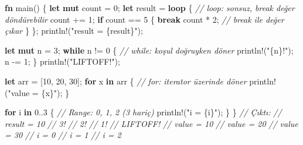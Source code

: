 \documentclass[12pt,a4paper]{article}
\newenvironment{Shaded}{}{}
\newcommand{\CommentTok}[1]{\textcolor[rgb]{0.38,0.63,0.69}{\textit{#1}}}
\newcommand{\ControlFlowTok}[1]{\textcolor[rgb]{0.00,0.44,0.13}{\textbf{#1}}}
\newcommand{\DecValTok}[1]{\textcolor[rgb]{0.25,0.63,0.44}{#1}}
\newcommand{\FunctionTok}[1]{\textcolor[rgb]{0.02,0.16,0.49}{#1}}
\newcommand{\KeywordTok}[1]{\textcolor[rgb]{0.00,0.44,0.13}{\textbf{#1}}}
\newcommand{\NormalTok}[1]{#1}
\newcommand{\OperatorTok}[1]{\textcolor[rgb]{0.40,0.40,0.40}{#1}}
\newcommand{\StringTok}[1]{\textcolor[rgb]{0.25,0.44,0.63}{#1}}
\begin{document}
\begin{Shaded}
\begin{Highlighting}[]
\KeywordTok{fn} \FunctionTok{main}\OperatorTok{()} \OperatorTok{\{}
    \KeywordTok{let} \KeywordTok{mut}\NormalTok{ count }\OperatorTok{=} \DecValTok{0}\OperatorTok{;}
    \KeywordTok{let}\NormalTok{ result }\OperatorTok{=} \ControlFlowTok{loop} \OperatorTok{\{}            \CommentTok{// loop: sonsuz, break değer döndürebilir}
\NormalTok{        count }\OperatorTok{+=} \DecValTok{1}\OperatorTok{;}
        \ControlFlowTok{if}\NormalTok{ count }\OperatorTok{==} \DecValTok{5} \OperatorTok{\{}
            \ControlFlowTok{break}\NormalTok{ count }\OperatorTok{*} \DecValTok{2}\OperatorTok{;}       \CommentTok{// break ile değer çıkar}
        \OperatorTok{\}}
    \OperatorTok{\};}
\NormalTok{    println}\OperatorTok{!(}\StringTok{"result = \{result\}"}\OperatorTok{);}

    \KeywordTok{let} \KeywordTok{mut}\NormalTok{ n }\OperatorTok{=} \DecValTok{3}\OperatorTok{;}
    \ControlFlowTok{while}\NormalTok{ n }\OperatorTok{!=} \DecValTok{0} \OperatorTok{\{}                 \CommentTok{// while: koşul doğruyken döner}
\NormalTok{        println}\OperatorTok{!(}\StringTok{"\{n\}!"}\OperatorTok{);}
\NormalTok{        n }\OperatorTok{-=} \DecValTok{1}\OperatorTok{;}
    \OperatorTok{\}}
\NormalTok{    println}\OperatorTok{!(}\StringTok{"LIFTOFF!"}\OperatorTok{);}

    \KeywordTok{let}\NormalTok{ arr }\OperatorTok{=} \OperatorTok{[}\DecValTok{10}\OperatorTok{,} \DecValTok{20}\OperatorTok{,} \DecValTok{30}\OperatorTok{];}
    \ControlFlowTok{for}\NormalTok{ x }\KeywordTok{in}\NormalTok{ arr }\OperatorTok{\{}                 \CommentTok{// for: iterator üzerinde döner}
\NormalTok{        println}\OperatorTok{!(}\StringTok{"value = \{x\}"}\OperatorTok{);}
    \OperatorTok{\}}

    \ControlFlowTok{for}\NormalTok{ i }\KeywordTok{in} \DecValTok{0}\OperatorTok{..}\DecValTok{3} \OperatorTok{\{}                \CommentTok{// Range: 0, 1, 2 (3 hariç)}
\NormalTok{        println}\OperatorTok{!(}\StringTok{"i = \{i\}"}\OperatorTok{);}
    \OperatorTok{\}}
\OperatorTok{\}}
\CommentTok{// Çıktı:}
\CommentTok{// result = 10}
\CommentTok{// 3!}
\CommentTok{// 2!}
\CommentTok{// 1!}
\CommentTok{// LIFTOFF!}
\CommentTok{// value = 10}
\CommentTok{// value = 20}
\CommentTok{// value = 30}
\CommentTok{// i = 0}
\CommentTok{// i = 1}
\CommentTok{// i = 2}
\end{Highlighting}
\end{Shaded}
\end{document}

